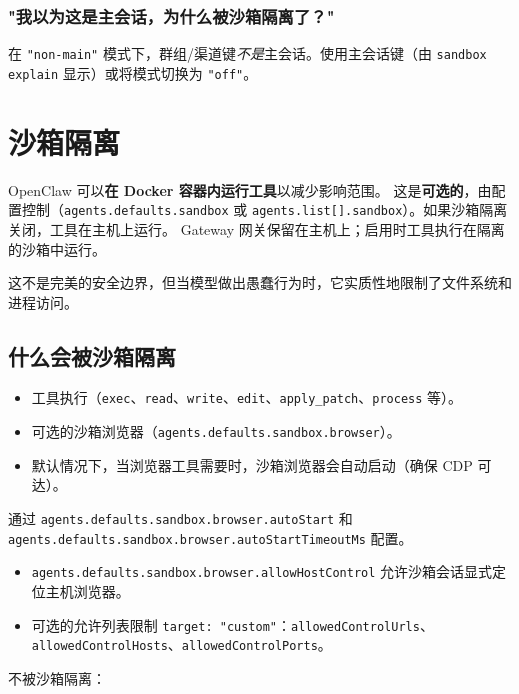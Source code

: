 \subsubsection{"我以为这是主会话，为什么被沙箱隔离了？"}


在 \texttt{"non-main"} 模式下，群组/渠道键\textit{不是}主会话。使用主会话键（由 \texttt{sandbox explain} 显示）或将模式切换为 \texttt{"off"}。


\clearpage

\section{沙箱隔离}


OpenClaw 可以\textbf{在 Docker 容器内运行工具}以减少影响范围。
这是\textbf{可选的}，由配置控制（\texttt{agents.defaults.sandbox} 或 \texttt{agents.list[].sandbox}）。如果沙箱隔离关闭，工具在主机上运行。
Gateway 网关保留在主机上；启用时工具执行在隔离的沙箱中运行。

这不是完美的安全边界，但当模型做出愚蠢行为时，它实质性地限制了文件系统和进程访问。

\subsection{什么会被沙箱隔离}


\begin{itemize}
  \item 工具执行（\texttt{exec}、\texttt{read}、\texttt{write}、\texttt{edit}、\texttt{apply\_patch}、\texttt{process} 等）。
  \item 可选的沙箱浏览器（\texttt{agents.defaults.sandbox.browser}）。
  \item 默认情况下，当浏览器工具需要时，沙箱浏览器会自动启动（确保 CDP 可达）。
\end{itemize}

通过 \texttt{agents.defaults.sandbox.browser.autoStart} 和 \texttt{agents.defaults.sandbox.browser.autoStartTimeoutMs} 配置。
\begin{itemize}
  \item \texttt{agents.defaults.sandbox.browser.allowHostControl} 允许沙箱会话显式定位主机浏览器。
  \item 可选的允许列表限制 \texttt{target: "custom"}：\texttt{allowedControlUrls}、\texttt{allowedControlHosts}、\texttt{allowedControlPorts}。
\end{itemize}


不被沙箱隔离：

